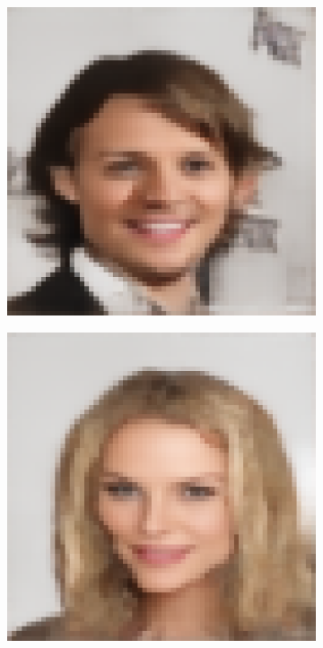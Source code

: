 \documentclass{IEEEcsmag}
\begin{document}
\begin{figure}[ht]
    \smallskip
    \setcounter{subfigure}{0}

    \begin{subfigure}{0.12\textwidth}
        \includegraphics[width=\linewidth]{images/CelebA/1/proposed_ae_4.png}
    \end{subfigure}
    \begin{subfigure}{0.12\textwidth}
        \includegraphics[width=\linewidth]{images/CelebA/1/proposed_ae_2.png}

\end{subfigure}
\end{figure}
\end{document}
